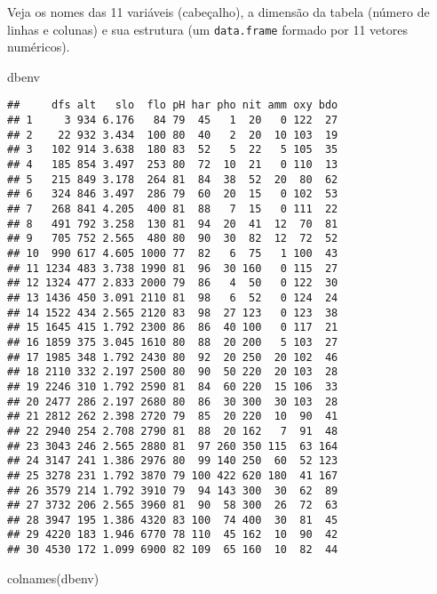 \documentclass[
]{book}
\newenvironment{Shaded}{\begin{snugshade}}{\end{snugshade}}
\newcommand{\FunctionTok}[1]{\textcolor[rgb]{0.00,0.00,0.00}{#1}}
\newcommand{\NormalTok}[1]{#1}
\begin{document}
Veja os nomes das 11 variáveis (cabeçalho), a dimensão da tabela (número de linhas e colunas) e sua estrutura (um \texttt{data.frame} formado por 11 vetores numéricos).

\begin{Shaded}
\begin{Highlighting}[]
\NormalTok{dbenv}
\end{Highlighting}
\end{Shaded}

\begin{verbatim}
##     dfs alt   slo  flo pH har pho nit amm oxy bdo
## 1     3 934 6.176   84 79  45   1  20   0 122  27
## 2    22 932 3.434  100 80  40   2  20  10 103  19
## 3   102 914 3.638  180 83  52   5  22   5 105  35
## 4   185 854 3.497  253 80  72  10  21   0 110  13
## 5   215 849 3.178  264 81  84  38  52  20  80  62
## 6   324 846 3.497  286 79  60  20  15   0 102  53
## 7   268 841 4.205  400 81  88   7  15   0 111  22
## 8   491 792 3.258  130 81  94  20  41  12  70  81
## 9   705 752 2.565  480 80  90  30  82  12  72  52
## 10  990 617 4.605 1000 77  82   6  75   1 100  43
## 11 1234 483 3.738 1990 81  96  30 160   0 115  27
## 12 1324 477 2.833 2000 79  86   4  50   0 122  30
## 13 1436 450 3.091 2110 81  98   6  52   0 124  24
## 14 1522 434 2.565 2120 83  98  27 123   0 123  38
## 15 1645 415 1.792 2300 86  86  40 100   0 117  21
## 16 1859 375 3.045 1610 80  88  20 200   5 103  27
## 17 1985 348 1.792 2430 80  92  20 250  20 102  46
## 18 2110 332 2.197 2500 80  90  50 220  20 103  28
## 19 2246 310 1.792 2590 81  84  60 220  15 106  33
## 20 2477 286 2.197 2680 80  86  30 300  30 103  28
## 21 2812 262 2.398 2720 79  85  20 220  10  90  41
## 22 2940 254 2.708 2790 81  88  20 162   7  91  48
## 23 3043 246 2.565 2880 81  97 260 350 115  63 164
## 24 3147 241 1.386 2976 80  99 140 250  60  52 123
## 25 3278 231 1.792 3870 79 100 422 620 180  41 167
## 26 3579 214 1.792 3910 79  94 143 300  30  62  89
## 27 3732 206 2.565 3960 81  90  58 300  26  72  63
## 28 3947 195 1.386 4320 83 100  74 400  30  81  45
## 29 4220 183 1.946 6770 78 110  45 162  10  90  42
## 30 4530 172 1.099 6900 82 109  65 160  10  82  44
\end{verbatim}

\begin{Shaded}
\begin{Highlighting}[]
\FunctionTok{colnames}\NormalTok{(dbenv)}
\end{Highlighting}
\end{Shaded}
\end{document}
